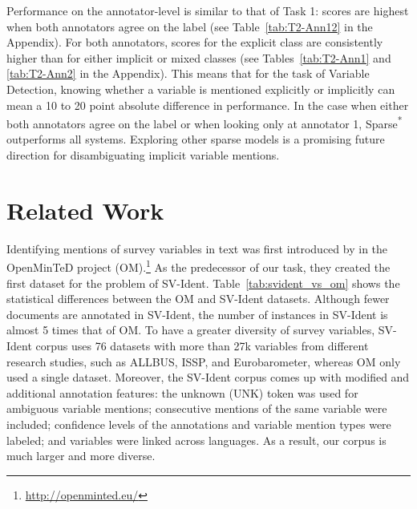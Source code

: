 \documentclass[11pt]{article}
\begin{document}
Performance on the annotator-level is similar to that of Task 1: scores are highest when both annotators agree on the label (see Table~\ref{tab:T2-Ann12} in the Appendix).
For both annotators, scores for the explicit class are consistently higher than for either implicit or mixed classes (see Tables~\ref{tab:T2-Ann1} and \ref{tab:T2-Ann2} in the Appendix).
This means that for the task of Variable Detection, knowing whether a variable is mentioned explicitly or implicitly can mean a 10 to 20 point absolute difference in performance.
In the case when either both annotators agree on the label or when looking only at annotator 1, Sparse\textsuperscript{*} outperforms all systems.
Exploring other sparse models is a promising future direction for disambiguating implicit variable mentions.


\section{Related Work}
\label{sec:related-work}
Identifying mentions of survey variables in text was first introduced by \citet{zielinski-mutschke-2017-mining, zielinski-mutschke-2018-towards} in the OpenMinTeD project (OM).\footnote{\url{http://openminted.eu/}}
As the predecessor of our task, they created the first dataset for the problem of SV-Ident.
Table~\ref{tab:svident_vs_om} shows the statistical differences between the OM and SV-Ident datasets. Although fewer documents are annotated in SV-Ident, the number of instances in SV-Ident is almost 5 times that of OM.
To have a greater diversity of survey variables, SV-Ident corpus uses 76 datasets with more than 27k variables from different research studies, such as ALLBUS, ISSP, and Eurobarometer, whereas OM only used a single dataset.
Moreover, the SV-Ident corpus comes up with modified and additional annotation features: the unknown (UNK) token was used for ambiguous variable mentions; consecutive mentions of the same variable were included; confidence levels of the annotations and variable mention types were labeled; and variables were linked across languages.
As a result, our corpus is much larger and more diverse.
\end{document}
